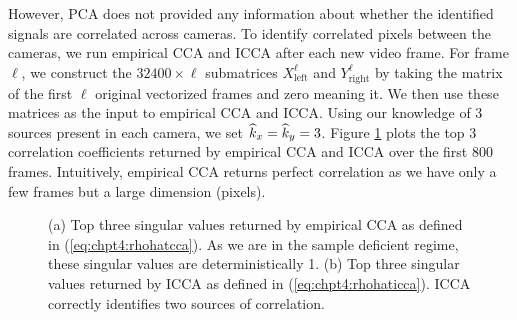 However, PCA does not provided any information about whether the identified signals are
correlated across cameras. To identify correlated pixels between the cameras, we run
empirical CCA and ICCA after each new video frame. For frame $\ell$, we construct the
$32400\times\ell$ submatrices $X_{\text{left}}^\ell$ and $Y_{\text{right}}^\ell$ by taking
the matrix of the first $\ell$ original vectorized frames and zero meaning it. We then use
these matrices as the input to empirical CCA and ICCA. Using our knowledge of 3 sources
present in each camera, we set $\widehat{k}_x=\widehat{k}_y=3$. Figure \ref{fig:chpt4:flashing_corrs}
plots the top 3 correlation coefficients returned by empirical CCA and ICCA over the first
800 frames. Intuitively, empirical CCA returns perfect correlation as we have only a few
frames but a large dimension (pixels).

\begin{figure}
  \begin{center}
    \caption{(a) Top three singular values returned by empirical CCA as defined in
      (\ref{eq:chpt4:rhohatcca}). As we are in the sample deficient regime, these singular
      values are deterministically 1. (b) Top three singular values returned by ICCA as
      defined in (\ref{eq:chpt4:rhohaticca}). ICCA correctly identifies two sources of
      correlation.}
    \label{fig:chpt4:flashing_corrs}
  \end{center}
\end{figure}

